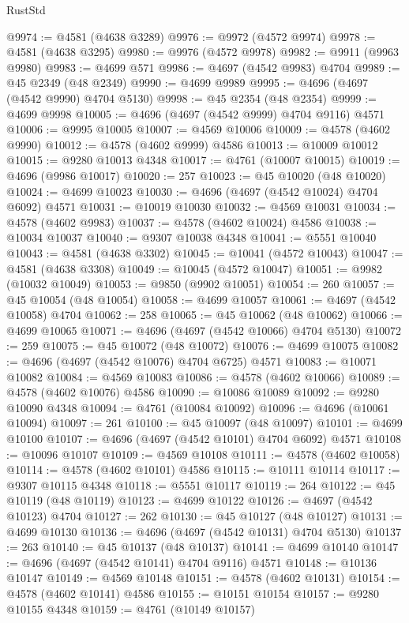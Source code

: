 \begin{lexlean}{RustStd}
\begin{coremodule}
@9974 := @4581 (@4638 @3289)
@9976 := @9972 (@4572 @9974)
@9978 := @4581 (@4638 @3295)
@9980 := @9976 (@4572 @9978)
@9982 := @9911 (@9963 @9980)
@9983 := @4699 @571
@9986 := @4697 (@4542 @9983) @4704
@9989 := @45 @2349 (@48 @2349)
@9990 := @4699 @9989
@9995 := @4696 (@4697 (@4542 @9990) @4704 @5130)
@9998 := @45 @2354 (@48 @2354)
@9999 := @4699 @9998
@10005 := @4696 (@4697 (@4542 @9999) @4704 @9116) @4571
@10006 := @9995 @10005
@10007 := @4569 @10006
@10009 := @4578 (@4602 @9990)
@10012 := @4578 (@4602 @9999) @4586
@10013 := @10009 @10012
@10015 := @9280 @10013 @4348
@10017 := @4761 (@10007 @10015)
@10019 := @4696 (@9986 @10017)
@10020 := 257
@10023 := @45 @10020 (@48 @10020)
@10024 := @4699 @10023
@10030 := @4696 (@4697 (@4542 @10024) @4704 @6092) @4571
@10031 := @10019 @10030
@10032 := @4569 @10031
@10034 := @4578 (@4602 @9983)
@10037 := @4578 (@4602 @10024) @4586
@10038 := @10034 @10037
@10040 := @9307 @10038 @4348
@10041 := @5551 @10040
@10043 := @4581 (@4638 @3302)
@10045 := @10041 (@4572 @10043)
@10047 := @4581 (@4638 @3308)
@10049 := @10045 (@4572 @10047)
@10051 := @9982 (@10032 @10049)
@10053 := @9850 (@9902 @10051)
@10054 := 260
@10057 := @45 @10054 (@48 @10054)
@10058 := @4699 @10057
@10061 := @4697 (@4542 @10058) @4704
@10062 := 258
@10065 := @45 @10062 (@48 @10062)
@10066 := @4699 @10065
@10071 := @4696 (@4697 (@4542 @10066) @4704 @5130)
@10072 := 259
@10075 := @45 @10072 (@48 @10072)
@10076 := @4699 @10075
@10082 := @4696 (@4697 (@4542 @10076) @4704 @6725) @4571
@10083 := @10071 @10082
@10084 := @4569 @10083
@10086 := @4578 (@4602 @10066)
@10089 := @4578 (@4602 @10076) @4586
@10090 := @10086 @10089
@10092 := @9280 @10090 @4348
@10094 := @4761 (@10084 @10092)
@10096 := @4696 (@10061 @10094)
@10097 := 261
@10100 := @45 @10097 (@48 @10097)
@10101 := @4699 @10100
@10107 := @4696 (@4697 (@4542 @10101) @4704 @6092) @4571
@10108 := @10096 @10107
@10109 := @4569 @10108
@10111 := @4578 (@4602 @10058)
@10114 := @4578 (@4602 @10101) @4586
@10115 := @10111 @10114
@10117 := @9307 @10115 @4348
@10118 := @5551 @10117
@10119 := 264
@10122 := @45 @10119 (@48 @10119)
@10123 := @4699 @10122
@10126 := @4697 (@4542 @10123) @4704
@10127 := 262
@10130 := @45 @10127 (@48 @10127)
@10131 := @4699 @10130
@10136 := @4696 (@4697 (@4542 @10131) @4704 @5130)
@10137 := 263
@10140 := @45 @10137 (@48 @10137)
@10141 := @4699 @10140
@10147 := @4696 (@4697 (@4542 @10141) @4704 @9116) @4571
@10148 := @10136 @10147
@10149 := @4569 @10148
@10151 := @4578 (@4602 @10131)
@10154 := @4578 (@4602 @10141) @4586
@10155 := @10151 @10154
@10157 := @9280 @10155 @4348
@10159 := @4761 (@10149 @10157)

\end{coremodule}
\end{lexlean}
